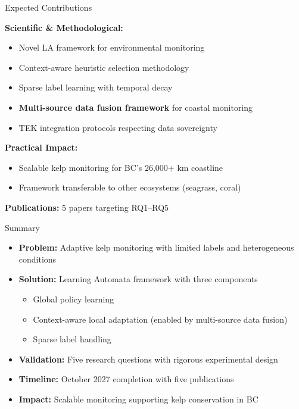 \documentclass[10pt,xcolor={table,dvipsnames}]{beamer}
\begin{document}
\begin{frame}{Expected Contributions}

\textbf{Scientific \& Methodological:}
\begin{itemize}
  \item Novel LA framework for environmental monitoring
  \item Context-aware heuristic selection methodology
  \item Sparse label learning with temporal decay
  \item \textbf{Multi-source data fusion framework} for coastal monitoring
  \item TEK integration protocols respecting data sovereignty
\end{itemize}

\vspace{0.4em}
\textbf{Practical Impact:}
\begin{itemize}
  \item Scalable kelp monitoring for BC's 26,000+ km coastline
  \item Framework transferable to other ecosystems (seagrass, coral)
\end{itemize}

\vspace{0.4em}
\textbf{Publications:} 5 papers targeting RQ1--RQ5

\end{frame}

\begin{frame}{Summary}

\begin{itemize}
  \item \textbf{Problem:} Adaptive kelp monitoring with limited labels and heterogeneous conditions

  \vspace{0.3em}
  \item \textbf{Solution:} Learning Automata framework with three components
  \begin{itemize}
    \item Global policy learning
    \item Context-aware local adaptation (enabled by multi-source data fusion)
    \item Sparse label handling
  \end{itemize}

  \vspace{0.3em}
  \item \textbf{Validation:} Five research questions with rigorous experimental design

  \vspace{0.3em}
  \item \textbf{Timeline:} October 2027 completion with five publications

  \vspace{0.3em}
  \item \textbf{Impact:} Scalable monitoring supporting kelp conservation in BC
\end{itemize}

\end{frame}
\end{document}
